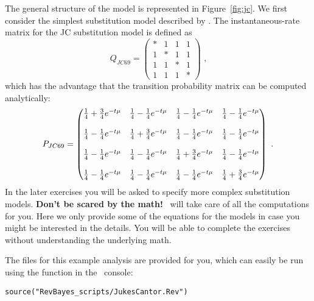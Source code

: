 The general structure of the model is represented in Figure~\ref{fig:jc}.
We first consider the simplest substitution model described by \citet{Jukes1969}.
The instantaneous-rate matrix for the JC substitution model is defined as
\begin{equation*}
Q_{JC69} = \begin{pmatrix} 
{*} & {1} & {1} & {1} \\ 
{1} & {*} & {1} & {1} \\ 
{1} & {1} & {*} & {1} \\ 
{1} & {1} & {1} & {*}  
\end{pmatrix} \mbox{  ,}
\end{equation*}
which has the advantage that the transition probability matrix can be computed analytically:
\begin{equation*}
P_{JC69} = \begin{pmatrix} {{1\over4} + {3\over4}e^{-t\mu}} & {{1\over4} - {1\over4}e^{-t\mu}} & {{1\over4} - {1\over4}e^{-t\mu}} & {{1\over4} - {1\over4}e^{-t\mu}} \\\\ {{1\over4} - {1\over4}e^{-t\mu}} & {{1\over4} + {3\over4}e^{-t\mu}} & {{1\over4} - {1\over4}e^{-t\mu}} & {{1\over4} - {1\over4}e^{-t\mu}} \\\\ {{1\over4} - {1\over4}e^{-t\mu}} & {{1\over4} - {1\over4}e^{-t\mu}} & {{1\over4} + {3\over4}e^{-t\mu}} & {{1\over4} - {1\over4}e^{-t\mu}} \\\\ {{1\over4} - {1\over4}e^{-t\mu}} & {{1\over4} - {1\over4}e^{-t\mu}} & {{1\over4} - {1\over4}e^{-t\mu}} & {{1\over4} + {3\over4}e^{-t\mu}}  
\end{pmatrix} \mbox{  .}
\end{equation*}
In the later exercises you will be asked to specify more complex substitution models.
\textbf{Don't be scared by the math!}
\RevBayes~will take care of all the computations for you.
Here we only provide some of the equations for the models in case you might be interested in the details.
You will be able to complete the exercises without understanding the underlying math.


The files for this example analysis are provided for you, which can easily be run using the  function in the \RevBayes~console:
{\tt \begin{snugshade*}
\begin{lstlisting}
source("RevBayes_scripts/JukesCantor.Rev")
\end{lstlisting}
\end{snugshade*}}

